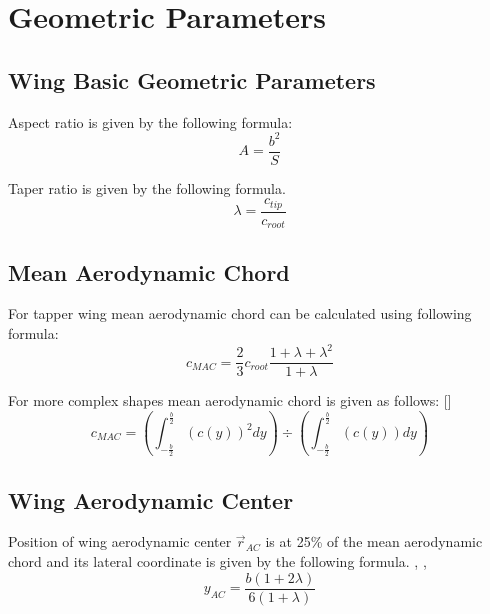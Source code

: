 \chapter{Geometric Parameters}

\section{Wing Basic Geometric Parameters}

Aspect ratio is given by the following formula: \cite{Raymer1992}
\begin{equation}
  A = \frac{b^2}{S}
\end{equation}

Taper ratio is given by the following formula. \cite{Raymer1992}
\begin{equation}
  \lambda = \frac{c_{tip}}{c_{root}}
\end{equation}

\section{Mean Aerodynamic Chord}

For tapper wing mean aerodynamic chord can be calculated using following formula: \cite{Galinski2016}
\begin{equation}
  c_{MAC} = \frac{2}{3} c_{root} \frac{1+\lambda+\lambda^2}{1+\lambda}
\end{equation}

For more complex shapes mean aerodynamic chord is given as follows: [] %
\begin{equation}
  c_{MAC} = 
  \left(
    \int_{-\frac{b}{2}}^{\frac{b}{2}} \left( c \left( y \right) \right)^2 dy
  \right)
  \div
  \left(
    \int_{-\frac{b}{2}}^{\frac{b}{2}} \left( c \left( y \right) \right) dy
  \right)
\end{equation}

\section{Wing Aerodynamic Center}

Position of wing aerodynamic center ${\vec r}_{AC}$ is at 25\% of the mean aerodynamic chord and its lateral coordinate is given by the following formula. \cite{Raymer1992}, \cite{Galinski2016}, \cite{Torenbeek1982}
\begin{equation}
  y_{AC} =
  \frac{ b \left( 1 + 2 \lambda \right) }{ 6 \left( 1 + \lambda \right) }
\end{equation}
